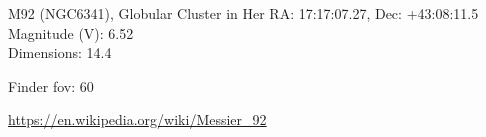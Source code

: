 \begin{block}{M92 (NGC6341), Globular Cluster in Her}
    RA: 17:17:07.27, Dec: +43:08:11.5 \\ 
    Magnitude (V): 6.52 \\ 
    Dimensions: 14.4 

    Finder fov: 60 

    \url{https://en.wikipedia.org/wiki/Messier_92} 
\end{block}